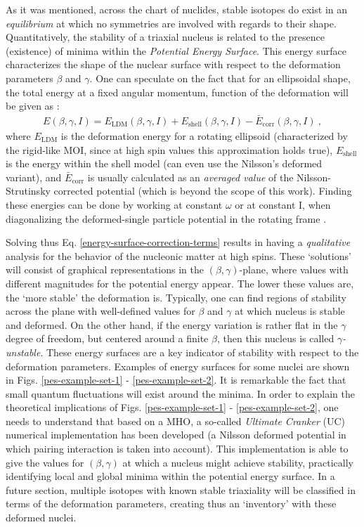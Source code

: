 As it was mentioned, across the chart of nuclides, stable isotopes do exist in an \emph{equilibrium} at which no symmetries are involved with regards to their shape. Quantitatively, the stability of a triaxial nucleus is related to the presence (existence) of minima within the \emph{Potential Energy Surface}. This energy surface characterizes the shape of the nuclear surface with respect to the deformation parameters $\beta$ and $\gamma$. One can speculate on the fact that for an ellipsoidal shape, the total energy at a fixed angular momentum, function of the deformation will be given as \cite{ring2004nuclear}:
\begin{align}
    E(\beta,\gamma,I)=E_\text{LDM}(\beta,\gamma,I)+E_\text{shell}(\beta,\gamma,I)-\bar{E}_\text{corr}(\beta,\gamma,I)\ ,
    \label{energy-surface-correction-terms}
\end{align}
where $E_\text{LDM}$ is the deformation energy for a rotating ellipsoid (characterized by the rigid-like MOI, since at high spin values this approximation holds true), $E_\text{shell}$ is the energy within the shell model (can even use the Nilsson's deformed variant), and $\bar{E}_\text{corr}$ is usually calculated as an \emph{averaged value} of the Nilsson-Strutinsky corrected potential \cite{brack1972funny} (which is beyond the scope of this work). Finding these energies can be done by working at constant $\omega$ or at constant I, when diagonalizing the deformed-single particle potential in the rotating frame \cite{ring2004nuclear}.

Solving thus Eq. \ref{energy-surface-correction-terms} results in having a \emph{qualitative} analysis for the behavior of the nucleonic matter at high spins. These `solutions' will consist of graphical representations in the $(\beta,\gamma)$-plane, where values with different magnitudes for the potential energy appear. The lower these values are, the `more stable' the deformation is. Typically, one can find regions of stability across the plane with well-defined values for $\beta$ and $\gamma$ at which nucleus is stable and deformed. On the other hand, if the energy variation is rather flat in the $\gamma$ degree of freedom, but centered around a finite $\beta$, then this nucleus is called \emph{$\gamma$-unstable}. These energy surfaces are a key indicator of stability with respect to the deformation parameters. Examples of energy surfaces for some nuclei are shown in Figs. \ref{pes-example-set-1} - \ref{pes-example-set-2}. It is remarkable the fact that small quantum fluctuations will exist around the minima.
In order to explain the theoretical implications of Figs. \ref{pes-example-set-1} - \ref{pes-example-set-2}, one needs to understand that based on a MHO, a so-called \emph{Ultimate Cranker} (UC) numerical implementation has been developed \cite{bengtsson1989method,bengtsson1990high} (a Nilsson deformed potential in which pairing interaction is taken into account). This implementation is able to give the values for $(\beta,\gamma)$ at which a nucleus might achieve stability, practically identifying local and global minima within the potential energy surface. In a future section, multiple isotopes with known stable triaxiality will be classified in terms of the deformation parameters, creating thus an `inventory' with these deformed nuclei.

